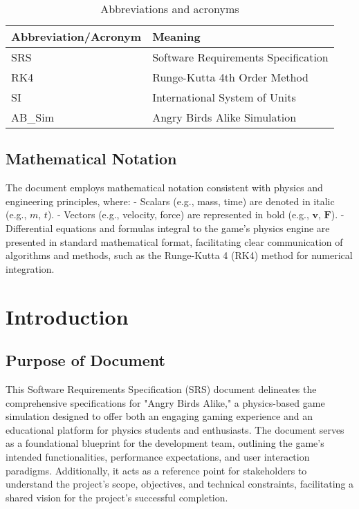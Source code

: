\documentclass[12pt]{article}
\begin{document}
\begin{table}[H]
\centering
\begin{tabular}{|l|l|}
\hline
\textbf{Abbreviation/Acronym} & \textbf{Meaning} \\
\hline
SRS & Software Requirements Specification \\
RK4 & Runge-Kutta 4th Order Method \\
SI & International System of Units \\
AB\_Sim & Angry Birds Alike Simulation \\
\hline
\end{tabular}
\caption{Abbreviations and acronyms}
\label{table:abbreviations}
\end{table}

\subsection{Mathematical Notation}
The document employs mathematical notation consistent with physics and engineering principles, where:
- Scalars (e.g., mass, time) are denoted in italic (e.g., \(m\), \(t\)).
- Vectors (e.g., velocity, force) are represented in bold (e.g., \(\mathbf{v}\), \(\mathbf{F}\)).
- Differential equations and formulas integral to the game's physics engine are presented in standard mathematical format, facilitating clear communication of algorithms and methods, such as the Runge-Kutta 4 (RK4) method for numerical integration.

\newpage

\section{Introduction}

\subsection{Purpose of Document}
This Software Requirements Specification (SRS) document delineates the comprehensive specifications for "Angry Birds Alike," a physics-based game simulation designed to offer both an engaging gaming experience and an educational platform for physics students and enthusiasts. The document serves as a foundational blueprint for the development team, outlining the game's intended functionalities, performance expectations, and user interaction paradigms. Additionally, it acts as a reference point for stakeholders to understand the project's scope, objectives, and technical constraints, facilitating a shared vision for the project's successful completion.
\end{document}

